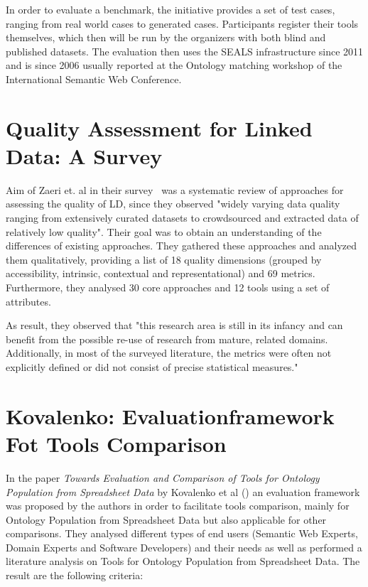 In order to evaluate a benchmark, the initiative provides a set of test cases, ranging from real world cases to generated cases. Participants register their tools themselves, which then will be run by the organizers with both blind and published datasets. The evaluation then uses the SEALS infrastructure since 2011 and is since 2006 usually reported at the Ontology matching workshop of the International Semantic Web Conference.

\section{Quality Assessment for Linked Data: A Survey}

Aim of Zaeri et. al in their survey~\cite{zaveri2016quality} was a systematic review of approaches for assessing the quality of LD, since they observed "widely varying data quality ranging from extensively curated datasets to crowdsourced and extracted data of relatively low quality". Their goal was to obtain an understanding of the differences of existing approaches. They gathered these approaches and analyzed them qualitatively, providing a list of 18 quality dimensions (grouped by accessibility, intrinsic, contextual and representational) and 69 metrics. Furthermore, they analysed 30 core approaches and 12 tools using a set of attributes.

As result, they observed that "this research area is still in its infancy and can benefit from the possible re-use of research from mature, related domains. Additionally, in most of the surveyed literature, the metrics were often not explicitly defined or did not consist of precise statistical measures."

\section{Kovalenko: Evaluationframework Fot Tools Comparison}

In the paper \emph{Towards Evaluation and Comparison of Tools for Ontology Population from Spreadsheet Data} by Kovalenko et al (\cite{kovalenko2013towards}) an evaluation framework was proposed by the authors in order to facilitate tools comparison, mainly for Ontology Population from Spreadsheet Data but also applicable for other comparisons. They analysed different types of end users (Semantic Web Experts, Domain Experts and Software Developers) and their needs as well as performed a literature analysis on Tools for Ontology Population from Spreadsheet Data. The result are the following criteria:

